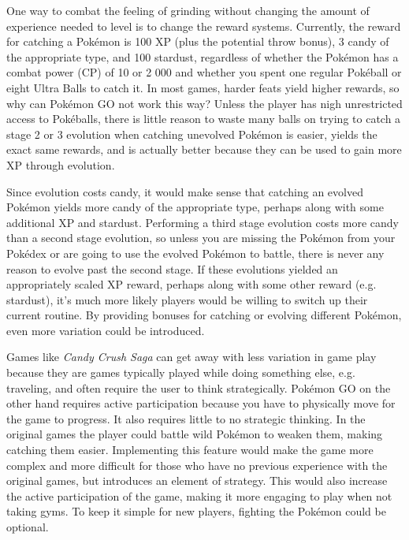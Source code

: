 One way to combat the feeling of grinding without changing the amount of experience needed to level is to change the reward systems. Currently, the reward for catching a Pokémon is 100 XP (plus the potential throw bonus), 3 candy of the appropriate type, and 100 stardust, regardless of whether the Pokémon has a combat power (CP) of 10 or 2 000 and whether you spent one regular Pokéball or eight Ultra Balls to catch it. In most games, harder feats yield higher rewards, so why can Pokémon GO not work this way? Unless the player has nigh unrestricted access to Pokéballs, there is little reason to waste many balls on trying to catch a stage 2 or 3 evolution when catching unevolved Pokémon is easier, yields the exact same rewards, and is actually better because they can be used to gain more XP through evolution.

Since evolution costs candy, it would make sense that catching an evolved Pokémon yields more candy of the appropriate type, perhaps along with some additional XP and stardust. Performing a third stage evolution costs more candy than a second stage evolution, so unless you are missing the Pokémon from your Pokédex or are going to use the evolved Pokémon to battle, there is never any reason to evolve past the second stage. If these evolutions yielded an appropriately scaled XP reward, perhaps along with some other reward (e.g. stardust), it's much more likely players would be willing to switch up their current routine. By providing bonuses for catching or evolving different Pokémon, even more variation could be introduced.

Games like \emph{Candy Crush Saga} can get away with less variation in game play because they are games typically played while doing something else, e.g. traveling, and often require the user to think strategically. Pokémon GO on the other hand requires active participation because you have to physically move for the game to progress. It also requires little to no strategic thinking. In the original games the player could battle wild Pokémon to weaken them, making catching them easier. Implementing this feature would make the game more complex and more difficult for those who have no previous experience with the original games, but introduces an element of strategy. This would also increase the active participation of the game, making it more engaging to play when not taking gyms. To keep it simple for new players, fighting the Pokémon could be optional.

